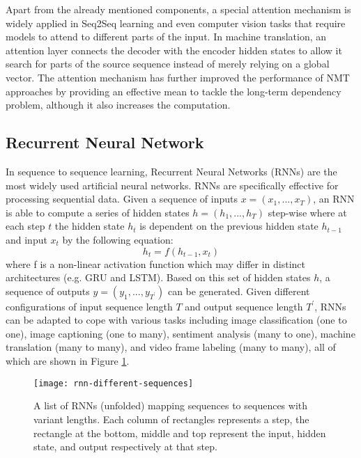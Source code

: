 Apart from the already mentioned components, a special attention mechanism is widely applied in Seq2Seq learning and even computer vision tasks that require models to attend to different parts of the input. In machine translation, an attention layer connects the decoder with the encoder hidden states to allow it search for parts of the source sequence instead of merely relying on a global vector. The attention mechanism has further improved the performance of NMT approaches by providing an effective mean to tackle the long-term dependency problem, although it also increases the computation.


\subsection{Recurrent Neural Network} \label{subsection:rnn}
In sequence to sequence learning, Recurrent Neural Networks (RNNs) are the most widely used artificial neural networks. RNNs are specifically effective for processing sequential data. Given a sequence of inputs $ x = (x_{1},...,x_{T}) $, an RNN is able to compute a series of hidden states $ h = (h_{1},...,h_{T}) $ step-wise where at each step $ t $ the hidden state $ h_{t} $ is dependent on the previous hidden state $ h_{t-1} $ and input $ x_{t} $ by the following equation:
\[ h_{t} = f(h_{t-1}, x_{t}) \]
where f is a non-linear activation function which may differ in distinct architectures (e.g. GRU and LSTM). Based on this set of hidden states $ h $, a sequence of outputs $ y = (y_{1},...,y_{T^{'}}) $ can be generated. Given different configurations of input sequence length $ T $ and output sequence length $ T^{'} $, RNNs can be adapted to cope with various tasks including image classification (one to one), image captioning (one to many), sentiment analysis (many to one), machine translation (many to many), and video frame labeling (many to many), all of which are shown in Figure \ref{figure:rnn different sequences}.

\begin{figure}[h]
\texttt{[image: rnn-different-sequences]}
\centering
\caption{A list of RNNs (unfolded) mapping sequences to sequences with variant lengths. Each column of rectangles represents a step, the rectangle at the bottom, middle and top represent the input, hidden state, and output respectively at that step.}
\label{figure:rnn different sequences}
\end{figure}

